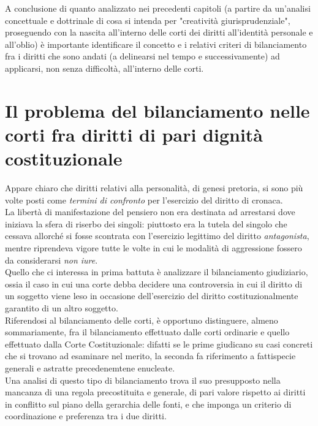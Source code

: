 A conclusione di quanto analizzato nei precedenti capitoli (a partire da un'analisi concettuale e dottrinale di cosa si intenda per "creatività giurisprudenziale", proseguendo con la nascita all'interno delle corti dei diritti all'identità personale e all'oblio) è importante identificare il concetto e i relativi criteri di bilanciamento fra i diritti che sono andati (a delinearsi nel tempo e successivamente) ad applicarsi, non senza difficoltà, all'interno delle corti.

\section{Il problema del bilanciamento nelle corti fra diritti di pari dignità costituzionale}
Appare chiaro che diritti relativi alla personalità, di genesi pretoria, si sono più volte posti come \textit{termini di confronto} per l'esercizio del diritto di cronaca.
\\La libertà di manifestazione del pensiero non era destinata ad arrestarsi dove iniziava la sfera di riserbo dei singoli: piuttosto era la tutela del singolo che cessava allorché si fosse scontrata con l'esercizio legittimo del diritto \textit{antagonista}, mentre riprendeva vigore tutte le volte in cui le modalità di aggressione fossero da considerarsi \textit{non iure}.
\\Quello che ci interessa in prima battuta è analizzare il bilanciamento giudiziario, ossia il caso in cui una corte debba decidere una controversia in cui il diritto di un soggetto viene leso in occasione dell'esercizio del diritto costituzionalmente garantito di un altro soggetto.
\\Riferendosi al bilanciamento delle corti, è opportuno distinguere, almeno sommariamente, fra il bilanciamento effettuato dalle corti ordinarie e quello effettuato dalla Corte Costituzionale: difatti se le prime giudicano su casi concreti che si trovano ad esaminare nel merito, la seconda fa riferimento a fattispecie generali e astratte precedenemtene enucleate. 
\\Una analisi di questo tipo di bilanciamento trova il suo presupposto nella mancanza di una regola precostituita e generale, di pari valore rispetto ai diritti in conflitto sul piano della gerarchia delle fonti, e che imponga un criterio di coordinazione e preferenza tra i due diritti.
